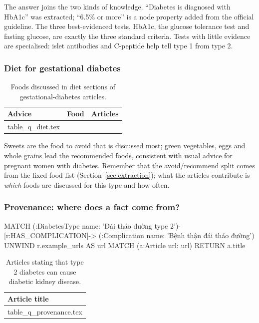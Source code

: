 \documentclass[11pt, a4paper]{article}
\makeatletter
\newcommand{\tabinput}[1]{\@@input #1 }   %
\makeatother
\begin{document}
The answer joins the two kinds of knowledge. ``Diabetes is diagnosed with HbA1c'' was extracted; ``6.5\% or more'' is a node property added from the official guideline. The three best-evidenced tests, HbA1c, the glucose tolerance test and fasting glucose, are exactly the three standard criteria. Tests with little evidence are specialised: islet antibodies and C-peptide help tell type 1 from type 2.

\subsubsection{Diet for gestational diabetes}

\begin{table}[H]
\centering
\small
\caption{Foods discussed in diet sections of gestational-diabetes articles.}
\label{tab:q-diet}
\begin{tabular}{l l r}
\toprule
Advice & Food & Articles \\
\midrule
\tabinput{table_q_diet.tex}
\bottomrule
\end{tabular}
\end{table}

Sweets are the food to avoid that is discussed most; green vegetables, eggs and whole grains lead the recommended foods, consistent with usual advice for pregnant women with diabetes. Remember that the avoid/recommend split comes from the fixed food list (Section~\ref{sec:extraction}); what the articles contribute is \emph{which} foods are discussed for this type and how often.

\subsubsection{Provenance: where does a fact come from?}

\begin{codeblock}
MATCH (:DiabetesType {name: 'Đái tháo đường type 2'})-[r:HAS_COMPLICATION]->
      (:Complication {name: 'Bệnh thận đái tháo đường'})
UNWIND r.example_urls AS url
MATCH (a:Article {url: url})
RETURN a.title
\end{codeblock}

\begin{table}[H]
\centering
\small
\caption{Articles stating that type 2 diabetes can cause diabetic kidney disease.}
\label{tab:q-provenance}
\begin{tabularx}{\textwidth}{X}
\toprule
Article title \\
\midrule
\tabinput{table_q_provenance.tex}
\bottomrule
\end{tabularx}
\end{table}
\end{document}
